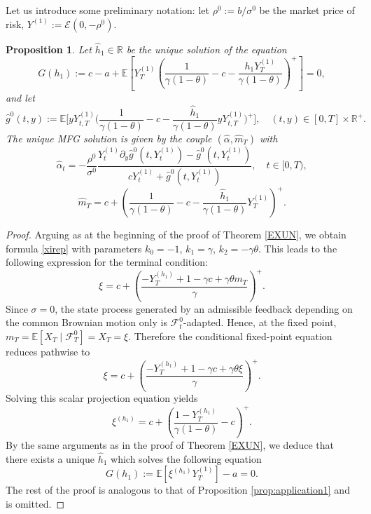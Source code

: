 \documentclass[11pt,a4paper]{article}
\newtheorem{prop}[theo]{Proposition}
\begin{document}
Let us introduce some preliminary notation: let $\rho^0 := b/\sigma^0$ be the market price of risk, $Y^{(1)} := \mathcal E (0, -\rho^0)$.
\begin{prop}
\label{prop:pure_common_noise}
Let $\hat h_1 \in \mathbb R$ be the unique solution of the equation 
\[
G(h_1):= c -a+ \mathbb E\left[Y_T^{(1)}\left(\frac{1}{\gamma(1-\theta)}-c-\frac{h_1Y_T^{(1)}}{{\gamma(1-\theta)}}\right)^+\right]=0,\]
and let
\[\hat g^0(t, y):=\mathbb{E}\!\bigg[yY^{(1)}_{t,T} \bigg(\frac{1}{\gamma(1-\theta)}-c - \dfrac{\hat h_1}{\gamma(1-\theta)}yY^{(1)}_{t,T}\bigg)^+\bigg], \quad (t,y)\in [0,T] \times \mathbb R^+.\]
The unique MFG solution is given by the couple $(\hat \alpha, \hat m_T)$ with
\begin{equation}
    \label{opt-com-alpha}
    \hat\alpha_t=-\frac{\rho^0}{\sigma^0}
\dfrac{Y^{(1)}_t\partial_{y}\hat g^0(t,Y^{(1)}_t) - \hat g^0(t,Y^{(1)}_t)}{cY^{(1)}_t+\hat g^0(t,Y^{(1)}_t)} , \quad t\in [0,T),
\end{equation}
\begin{equation}
    \label{opt-com-m}
\hat m_T= c + \left(\frac{1}{\gamma(1-\theta)}-c - \frac{\hat h_1}{\gamma(1-\theta)} Y^{(1)}_T \right)^+ .
\end{equation}
\end{prop}
\begin{proof}
Arguing as at the beginning of the proof of Theorem \ref{EXUN}, we obtain formula \eqref{xirep} with parameters $k_0 = -1$, $k_1 = \gamma$, $k_2 =-\gamma\theta$. This leads to the following expression for the terminal condition:
\begin{equation}
\label{xicommon}
    \xi=c+\left(\frac{-Y_T^{(h_1)}+1-\gamma c+\gamma \theta m_T}{\gamma}\right)^+.
\end{equation}
Since \(\sigma=0\), the state process generated by an admissible feedback depending on the common Brownian motion only is \(\mathcal F_t^0\)-adapted. Hence, at the fixed point, \(m_T=\mathbb E[X_T\mid\mathcal F_T^0]=X_T=\xi\). Therefore the conditional fixed-point equation reduces pathwise to
\[
\xi=c+\left(\frac{-Y_T^{(h_1)}+1-\gamma c+\gamma\theta\xi}{\gamma}\right)^+.
\]
Solving this scalar projection equation yields
\[
\xi^{(h_1)}=c+\left(\frac{1-Y_T^{(h_1)}}{\gamma(1-\theta)}-c\right)^+.
\]
By the same arguments as in the proof of Theorem \ref{EXUN}, we deduce that there exists a unique   $\hat h_1$  which solves the following  equation
\[G(h_1):=\mathbb E\left[\xi^{(h_1)}Y_T^{(1)} \right]-a=0.
\]  
The rest of the proof is analogous to that of Proposition \ref{prop:application1} and is omitted.
\end{proof}
\end{document}
